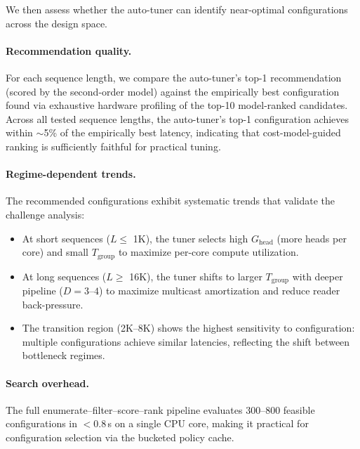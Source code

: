 \documentclass[sigconf, review, anonymous]{acmart}
\newcommand{\autoTuner}{auto-tuner}
\newcommand{\Ghead}{G_{\mathrm{head}}}
\newcommand{\Tgroup}{T_{\mathrm{group}}}
\begin{document}
We then assess whether the \autoTuner{} can identify near-optimal
configurations across the design space.

\paragraph{Recommendation quality.}
For each sequence length, we compare the \autoTuner{}'s top-1
recommendation (scored by the second-order model) against the
empirically best configuration found via exhaustive hardware profiling
of the top-10 model-ranked candidates.  Across all tested sequence
lengths, the \autoTuner{}'s top-1 configuration achieves within
$\sim$5\% of the empirically best latency, indicating that
cost-model-guided ranking is sufficiently faithful for practical tuning.

\paragraph{Regime-dependent trends.}
The recommended configurations exhibit systematic trends that validate
the challenge analysis:
\begin{itemize}
  \item At short sequences ($L \leq$ 1K), the tuner selects high
    $\Ghead$ (more heads per core) and small $\Tgroup$ to maximize
    per-core compute utilization.
  \item At long sequences ($L \geq$ 16K), the tuner shifts to larger
    $\Tgroup$ with deeper pipeline ($D{=}3\text{--}4$) to maximize
    multicast amortization and reduce reader back-pressure.
  \item The transition region (2K--8K) shows the highest sensitivity
    to configuration: multiple configurations achieve similar
    latencies, reflecting the shift between bottleneck regimes.
\end{itemize}

\paragraph{Search overhead.}
The full enumerate--filter--score--rank pipeline evaluates 300--800
feasible configurations in $<$0.8\,s on a single CPU core,
making it practical for configuration selection via the
bucketed policy cache.


\end{document}
